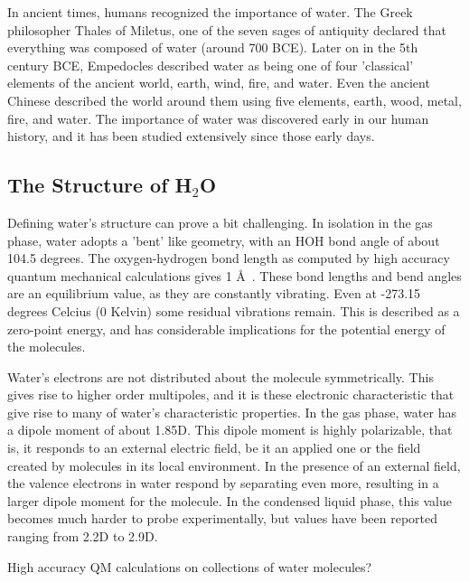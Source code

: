 In ancient times, humans recognized the importance of water. The Greek
philosopher Thales of Miletus, one of the seven sages of antiquity
declared that everything was composed of water (around 700 BCE). Later
on in the 5th century BCE, Empedocles described water as being one of
four 'classical' elements of the ancient world, earth, wind, fire, and
water. Even the ancient Chinese described the world around them using
five elements, earth, wood, metal, fire, and water. The importance of
water was discovered early in our human history, and it has been
studied extensively since those early days.  


\subsection{The Structure of H$_\mathrm{2}$O}
%
%
Defining water's structure can prove a bit challenging. In isolation
in the gas phase, water adopts a 'bent' like geometry, with an HOH
bond angle of about 104.5 degrees. The oxygen-hydrogen bond length as
computed by high accuracy quantum mechanical calculations gives 1
\AA~. These bond lengths and bend angles are an equilibrium value, as
they are constantly vibrating. Even at -273.15 degrees Celcius (0
Kelvin) some residual vibrations remain. This is described as a
zero-point energy, and has considerable implications for the potential
energy of the molecules. 

Water's electrons are not distributed about the molecule
symmetrically. This gives rise to higher order multipoles, and it is
these electronic characteristic that give rise to many of water's
characteristic properties. In the gas phase, water has a dipole moment
of about 1.85D. This dipole moment is highly polarizable, that is, it
responds to an external electric field, be it an applied one or the
field created by molecules in its local environment. In the presence
of an external field, the valence electrons in water respond by
separating even more, resulting in a larger dipole moment for the
molecule. In the condensed liquid phase, this value becomes much
harder to probe experimentally, but values have been reported ranging
from 2.2D to 2.9D. 

High accuracy QM calculations on collections of water molecules?

